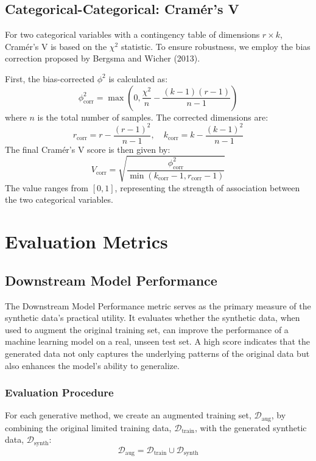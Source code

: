 \subsection{Categorical-Categorical: Cramér's V}
For two categorical variables with a contingency table of dimensions $r \times k$, Cramér's V is based on the $\chi^2$ statistic. To ensure robustness, we employ the bias correction proposed by Bergsma and Wicher (2013).

First, the bias-corrected $\phi^2$ is calculated as:
\begin{equation}
    \phi^2_{\text{corr}} = \max\left(0, \frac{\chi^2}{n} - \frac{(k-1)(r-1)}{n-1}\right)
\end{equation}
where $n$ is the total number of samples. The corrected dimensions are:
\begin{equation}
    r_{\text{corr}} = r - \frac{(r-1)^2}{n-1}, \quad k_{\text{corr}} = k - \frac{(k-1)^2}{n-1}
\end{equation}
The final Cramér's V score is then given by:
\begin{equation}
    V_{\text{corr}} = \sqrt{\frac{\phi^2_{\text{corr}}}{\min(k_{\text{corr}}-1, r_{\text{corr}}-1)}}
\end{equation}
The value ranges from $[0, 1]$, representing the strength of association between the two categorical variables.


\section{Evaluation Metrics}
\label{app:metrics}
\subsection{Downstream Model Performance}


The Downstream Model Performance metric serves as the primary measure of the synthetic data's practical utility. It evaluates whether the synthetic data, when used to augment the original training set, can improve the performance of a machine learning model on a real, unseen test set. A high score indicates that the generated data not only captures the underlying patterns of the original data but also enhances the model's ability to generalize.

\subsubsection{Evaluation Procedure}
For each generative method, we create an augmented training set, $\mathcal{D}_{\text{aug}}$, by combining the original limited training data, $\mathcal{D}_{\text{train}}$, with the generated synthetic data, $\mathcal{D}_{\text{synth}}$:
\begin{equation}
    \mathcal{D}_{\text{aug}} = \mathcal{D}_{\text{train}} \cup \mathcal{D}_{\text{synth}}
\end{equation}

